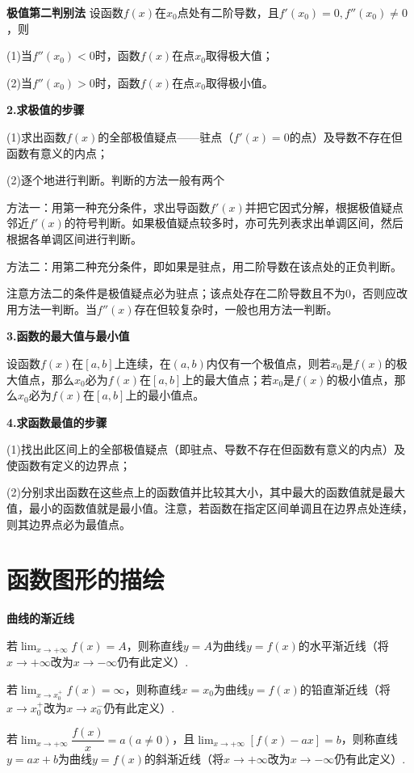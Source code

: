 \textbf{极值第二判别法} \quad 设函数$f(x)$在$x_0$点处有二阶导数，且$f'(x_0)=0,f''(x_0)\neq0$，则

(1)当$f''(x_0)<0$时，函数$f(x)$在点$x_0$取得极大值；

(2)当$f''(x_0)>0$时，函数$f(x)$在点$x_0$取得极小值。

\textbf{2.求极值的步骤}

(1)求出函数$f(x)$的全部极值疑点——驻点（$f'(x)=0$的点）及导数不存在但函数有意义的内点；

(2)逐个地进行判断。判断的方法一般有两个

方法一：用第一种充分条件，求出导函数$f'(x)$并把它因式分解，根据极值疑点邻近$f'(x)$的符号判断。如果极值疑点较多时，亦可先列表求出单调区间，然后根据各单调区间进行判断。

方法二：用第二种充分条件，即如果是驻点，用二阶导数在该点处的正负判断。

\begin{note}
    注意方法二的条件是极值疑点必为驻点；该点处存在二阶导数且不为0，否则应改用方法一判断。当$f''(x)$存在但较复杂时，一般也用方法一判断。
\end{note}

\textbf{3.函数的最大值与最小值}

设函数$f(x)$在$[a,b]$上连续，在$(a,b)$内仅有一个极值点，则若$x_0$是$f(x)$的极大值点，那么$x_0$必为$f(x)$在$[a,b]$上的最大值点；若$x_0$是$f(x)$的极小值点，那么$x_0$必为$f(x)$在$[a,b]$上的最小值点。

\textbf{4.求函数最值的步骤}

(1)找出此区间上的全部极值疑点（即驻点、导数不存在但函数有意义的内点）及使函数有定义的边界点；

(2)分别求出函数在这些点上的函数值并比较其大小，其中最大的函数值就是最大值，最小的函数值就是最小值。注意，若函数在指定区间单调且在边界点处连续，则其边界点必为最值点。

\section{函数图形的描绘}
\textbf{曲线的渐近线}

若$\displaystyle \lim_{x\rightarrow+\infty}f(x)=A$，则称直线$y=A$为曲线$y=f(x)$的水平渐近线（将$x\rightarrow+\infty$改为$x\rightarrow-\infty$仍有此定义）.

若$\displaystyle \lim_{x\rightarrow x_0^+}f(x)=\infty$，则称直线$x=x_0$为曲线$y=f(x)$的铅直渐近线（将$x\rightarrow x_0^+$改为$x\rightarrow x_0^-$仍有此定义）.

若$\displaystyle \lim_{x\rightarrow+\infty}\dfrac{f(x)}{x}=a(a\neq0)$，且$\displaystyle \lim_{x\rightarrow+\infty}[f(x)-ax]=b$，则称直线$y=ax+b$为曲线$y=f(x)$的斜渐近线（将$x\rightarrow+\infty$改为$x\rightarrow-\infty$仍有此定义）.

